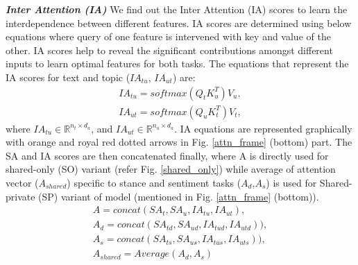 \documentclass[letterpaper]{article} %
\begin{document}
\par \noindent \textbf{\textit{Inter Attention (IA)}} We find out the Inter Attention (IA) scores to learn the interdependence between different features. IA scores are determined using below equations where query of one feature is intervened with key and value of the other. IA scores help to reveal the significant contributions amongst different inputs to learn optimal features for both tasks. The equations that represent the IA scores for text and topic ($IA_{tu}$, $IA_{ut}$) are:
\begin{gather}
    IA_{tu} = softmax(Q_{t}K^T_{u})V_{u}, \label{ia_1} \\
    IA_{ut} = softmax(Q_{u}K^T_{t})V_{t}, \label{ia_2}
\end{gather}
where $IA_{tu} \in \mathbb{R}^{n_{t} \times d_a} $, and $IA_{ut} \in \mathbb{R}^{n_{u} \times d_a} $. IA equations are represented graphically with orange and royal red dotted arrows in Fig. \ref{attn_frame} (bottom) part. The SA and IA scores are then concatenated finally, where A is directly used for shared-only (SO) variant (refer Fig. \ref{shared_only}) while average of attention vector ($A_{shared}$) specific to stance and sentiment tasks ($A_d$,$A_s$) is used for Shared-private (SP) variant of model (mentioned in Fig. \ref{attn_frame} (bottom)).
\begin{gather}
    A    = concat(SA_{t},SA_u, IA_{tu},IA_{ut}), \\
    A_{d} = concat(SA_{td},SA_{ud}, IA_{tud},IA_{utd})), \label{attn_pol}\\
    A_{s} = concat(SA_{ts},SA_{us}, IA_{tus},IA_{uts})),\\
    A_{shared} = Average(A_{d},A_{s}) \label{attn_sh}
\end{gather}
\end{document}
